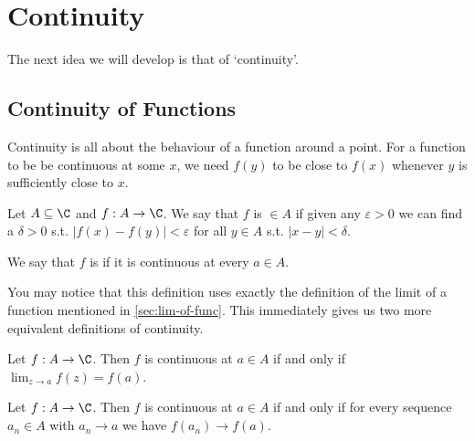 \section{Continuity}

The next idea we will develop is that of `continuity'. 

\subsection{Continuity of Functions}

Continuity is all about the behaviour of a function around a point. For a function to be be continuous at some $x$, we need $f(y)$ to be close to $f(x)$ whenever $y$ is sufficiently close to $x$.

\begin{definition}[Continuity]
	Let $A \subseteq \C$ and $f: A \rightarrow \C$. We say that $f$ is  $\in A$ if given any $\varepsilon > 0$ we can find a $\delta > 0$ s.t. $|f(x) - f(y)| < \varepsilon$ for all $y \in A$ s.t. $|x - y| < \delta$.


	We say that $f$ is  if it is continuous at every $a \in A$.
\end{definition}

You may notice that this definition uses exactly the definition of the limit of a function mentioned in \autoref{sec:lim-of-func}. This immediately gives us two more equivalent definitions of continuity.

\begin{proposition}
	Let $f: A \rightarrow \C$. Then $f$ is continuous at $a \in A$ if and only if $\displaystyle \lim_{z \to a} f(z) = f(a)$.
\end{proposition}

\begin{proposition}
	Let $f : A \rightarrow \C$. Then $f$ is continuous at $a \in A$ if and only if for every sequence $a_n \in A$ with $a_n \rightarrow a$ we have $f(a_n) \rightarrow f(a)$.
\end{proposition}

